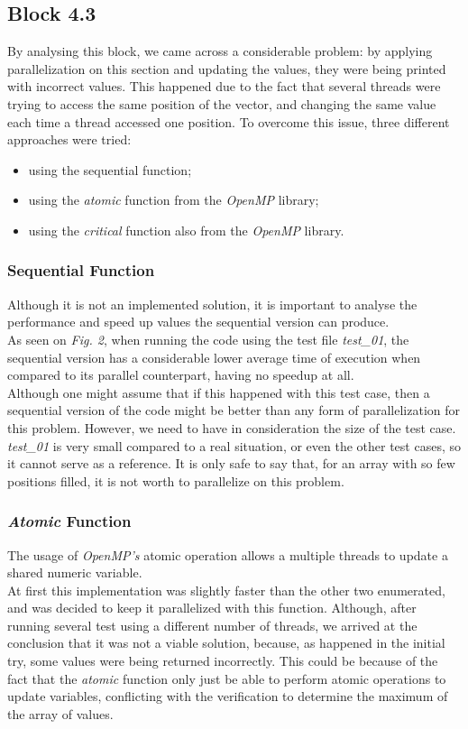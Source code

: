 \documentclass[10pt,journal,compsoc]{IEEEtran}
\begin{document}
\subsection{Block 4.3}

By analysing this block, we came across a considerable problem: by applying parallelization on this section and updating the values, they were being printed with incorrect values. This happened due to the fact that several threads were trying to access the same position of the vector, and changing the same value each time a thread accessed one position. To overcome this issue, three different approaches were tried: 
\begin{itemize}
  \item using the sequential function;
  \item using the {\itshape atomic} function from the {\itshape OpenMP} library;
  \item using the {\itshape critical} function also from the {\itshape OpenMP} library.
\end{itemize}

\subsubsection{Sequential Function}
Although it is not an implemented solution, it is important to analyse the performance and speed up values the sequential version can produce.
\\As seen on {\itshape{Fig. 2}}, when running the code using the test file {\itshape test\_01}, the sequential version has a considerable lower average time of execution when compared to its parallel counterpart, having no speedup at all. 
\\Although one might assume that if this happened with this test case, then a sequential version of the code might be better than any form of parallelization for this problem. However, we need to have in consideration the size of the test case. {\itshape test\_01} is very small compared to a real situation, or even the other test cases, so it cannot serve as a reference. It is only safe to say that, for an array with so few positions filled, it is not worth to parallelize on this problem.

\subsubsection{{\itshape Atomic} Function}
The usage of {\itshape OpenMP's} atomic operation allows a multiple threads to update a shared numeric variable.\cite{OpenFull}
\\At first this implementation was slightly faster than the other two enumerated, and was decided to keep it parallelized with this function. Although, after running several test using a different number of threads, we arrived at the conclusion that it was not a viable solution, because, as happened in the initial try, some values were being returned incorrectly. This could be because of the fact that the {\itshape atomic} function only just be able to perform atomic operations to update variables, conflicting with the verification to determine the maximum of the array of values. 
\end{document}
